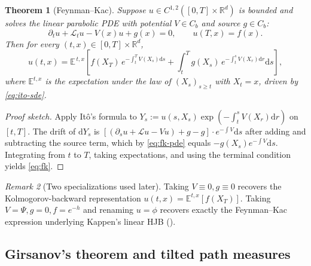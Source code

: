 \documentclass[11pt,letterpaper]{article}
\theoremstyle{plain}
\newtheorem{theorem}{Theorem}[section]
\theoremstyle{definition}
\theoremstyle{remark}
\newtheorem{remark}[theorem]{Remark}
\newcommand{\R}{\mathbb{R}}
\newcommand{\E}{\mathbb{E}}
\newcommand{\dd}{\mathrm{d}}
\newcommand{\calL}{\mathcal{L}}
\begin{document}
\begin{theorem}[Feynman--Kac]\label{thm:feynman-kac}
Suppose $u\in C^{1,2}([0,T]\times\R^d)$ is bounded and solves the linear
parabolic PDE with potential $V\in C_b$ and source $g\in C_b$:
\begin{equation}
  \partial_t u + \calL_t u - V(x)u + g(x) = 0,\qquad u(T,x)=f(x).
  \label{eq:fk-pde}
\end{equation}
Then for every $(t,x)\in[0,T]\times\R^d$,
\begin{equation}
  u(t,x) = \E^{\,t,x}\!\left[f(X_T)\,e^{-\int_t^T V(X_s)\dd s}
           + \!\int_t^T g(X_s)\,e^{-\int_t^s V(X_r)\dd r}\dd s\right],
  \label{eq:fk}
\end{equation}
where $\E^{t,x}$ is the expectation under the law of $(X_s)_{s\ge t}$
with $X_t=x$, driven by \eqref{eq:ito-sde}.
\end{theorem}
\begin{proof}[Proof sketch]
Apply It\^o's formula to $Y_s:=u(s,X_s)\exp(-\int_t^s V(X_r)\dd r)$ on
$[t,T]$. The drift of $\dd Y_s$ is
$[(\partial_s u+\calL u-Vu)+g-g]\cdot e^{-\int V}\dd s$ after adding and
subtracting the source term, which by \eqref{eq:fk-pde} equals
$-g(X_s)e^{-\int V}\dd s$. Integrating from $t$ to $T$, taking
expectations, and using the terminal condition yields \eqref{eq:fk}.
\end{proof}

\begin{remark}[Two specializations used later]\label{rem:fk-cases}
Taking $V\equiv 0,g\equiv 0$ recovers the Kolmogorov-backward
representation $u(t,x)=\E^{t,x}[f(X_T)]$. Taking
$V=\Psi,g=0,f=e^{-h}$ and renaming $u=\phi$ recovers exactly the
Feynman--Kac expression underlying Kappen's linear HJB
().
\end{remark}

\subsection{Girsanov's theorem and tilted path measures}\label{app:girsanov}
\end{document}
